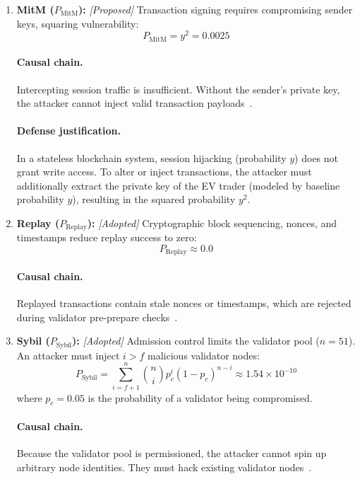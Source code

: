 \documentclass[10pt,twocolumn,journal]{IEEEtran}
\begin{document}
\begin{enumerate}[leftmargin=*]
    \item \textbf{MitM ($P_{\mathrm{MitM}}$):} \emph{[Proposed]} Transaction signing requires compromising sender keys, squaring vulnerability:
    \begin{equation}
    \label{eq:mitm_bc}
    P_{\mathrm{MitM}} = y^2 = 0.0025
    \end{equation}
    \paragraph{Causal chain.} Intercepting session traffic is insufficient. Without the sender's private key, the attacker cannot inject valid transaction payloads~\cite{baumeister2010}.
    \paragraph{Defense justification.} In a stateless blockchain system, session hijacking (probability $y$) does not grant write access. To alter or inject transactions, the attacker must additionally extract the private key of the EV trader (modeled by baseline probability $y$), resulting in the squared probability $y^2$.

    \item \textbf{Replay ($P_{\mathrm{Replay}}$):} \emph{[Adopted]} Cryptographic block sequencing, nonces, and timestamps reduce replay success to zero:
    \begin{equation}
    \label{eq:replay_bc}
    P_{\mathrm{Replay}} \approx 0.0
    \end{equation}
    \paragraph{Causal chain.} Replayed transactions contain stale nonces or timestamps, which are rejected during validator pre-prepare checks~\cite{yan2012}.

    \item \textbf{Sybil ($P_{\mathrm{Sybil}}$):} \emph{[Adopted]} Admission control limits the validator pool ($n=51$). An attacker must inject $i > f$ malicious validator nodes:
    \begin{equation}
    \label{eq:sybil_bc}
    P_{\mathrm{Sybil}} = \sum_{i=f+1}^{n} \binom{n}{i} p_c^i (1 - p_c)^{n-i} \approx 1.54 \times 10^{-10}
    \end{equation}
    where $p_c = 0.05$ is the probability of a validator being compromised.
    \paragraph{Causal chain.} Because the validator pool is permissioned, the attacker cannot spin up arbitrary node identities. They must hack existing validator nodes~\cite{li2020_blockchain}.


\end{enumerate}
\end{document}
